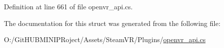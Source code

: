 Definition at line 661 of file openvr\+\_\+api.\+cs.



The documentation for this struct was generated from the following file\+:\begin{DoxyCompactItemize}
\item 
O\+:/\+Git\+H\+U\+B\+M\+I\+N\+I\+P\+Roject/\+Assets/\+Steam\+V\+R/\+Plugins/\mbox{\hyperlink{openvr__api_8cs}{openvr\+\_\+api.\+cs}}\end{DoxyCompactItemize}
